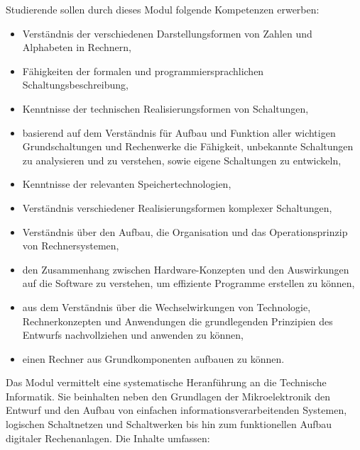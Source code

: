 \begin{module}
\begin{styleenv}
\begin{recommendations}
\end{recommendations}
\end{styleenv}

\begin{learningoutcomes}
Studierende sollen durch dieses Modul folgende Kompetenzen erwerben:

 \begin{itemize}\item Verständnis der verschiedenen Darstellungsformen von Zahlen und Alphabeten in Rechnern,  \item Fähigkeiten der formalen und programmiersprachlichen Schaltungsbeschreibung,  \item Kenntnisse der technischen Realisierungsformen von Schaltungen,  \item basierend auf dem Verständnis für Aufbau und Funktion aller wichtigen Grundschaltungen und Rechenwerke die Fähigkeit, unbekannte Schaltungen zu analysieren und zu verstehen, sowie eigene Schaltungen zu entwickeln,  \item Kenntnisse der relevanten Speichertechnologien,  \item Verständnis verschiedener Realisierungsformen komplexer Schaltungen,  \item Verständnis über den Aufbau, die Organisation und das Operationsprinzip von Rechnersystemen,  \item den Zusammenhang zwischen Hardware-Konzepten und den Auswirkungen auf die Software zu verstehen, um effiziente Programme erstellen zu können,   \item aus dem Verständnis über die Wechselwirkungen von Technologie, Rechnerkonzepten und Anwendungen die grundlegenden Prinzipien des Entwurfs nachvollziehen und anwenden zu können,  \item einen Rechner aus Grundkomponenten aufbauen zu können.  \end{itemize}
\end{learningoutcomes}

\begin{content}
Das Modul vermittelt eine systematische Heranführung an die Technische Informatik. Sie beinhalten neben den Grundlagen der Mikroelektronik den Entwurf und den Aufbau von einfachen informationsverarbeitenden Systemen, logischen Schaltnetzen und Schaltwerken bis hin zum funktionellen Aufbau digitaler Rechenanlagen. Die Inhalte umfassen:


\end{content}
\end{module}
